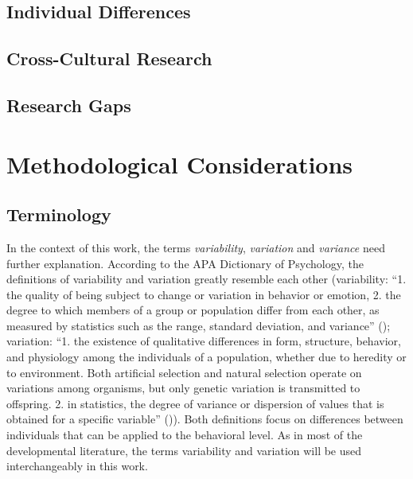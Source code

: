 \documentclass[
]{scrbook}
\begin{document}
\subsection{Individual Differences}\label{individual-differences-1}

\subsection{Cross-Cultural Research}\label{cross-cultural-research-1}

\subsection{Research Gaps}\label{research-gaps}

\section{Methodological Considerations}\label{methodological-considerations}

\subsection{Terminology}\label{terminology-2}

In the context of this work, the terms \emph{variability}, \emph{variation} and \emph{variance} need further explanation. According to the APA Dictionary of Psychology, the definitions of variability and variation greatly resemble each other (variability: ``1. the quality of being subject to change or variation in behavior or emotion, 2. the degree to which members of a group or population differ from each other, as measured by statistics such as the range, standard deviation, and variance'' (); variation: ``1. the existence of qualitative differences in form, structure, behavior, and physiology among the individuals of a population, whether due to heredity or to environment. Both artificial selection and natural selection operate on variations among organisms, but only genetic variation is transmitted to offspring. 2. in statistics, the degree of variance or dispersion of values that is obtained for a specific variable'' ()). Both definitions focus on differences between individuals that can be applied to the behavioral level. As in most of the developmental literature, the terms variability and variation will be used interchangeably in this work.
\end{document}
